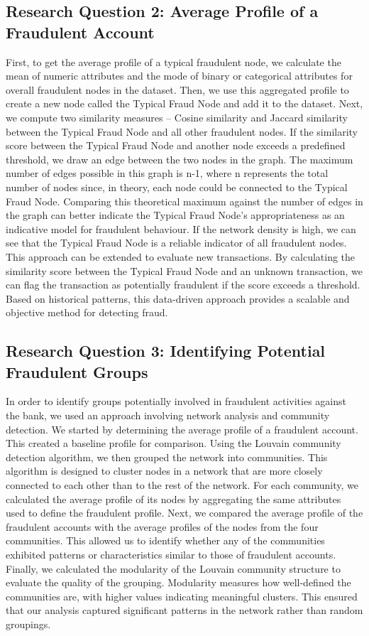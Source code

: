 \documentclass{styles/svproc}
\begin{document}
\subsection*{Research Question 2: Average Profile of a Fraudulent Account}
First, to get the average profile of a typical fraudulent node, we calculate the mean of numeric attributes and the mode of binary or categorical attributes for overall fraudulent nodes in the dataset. Then, we use this aggregated profile to create a new node called the Typical Fraud Node and add it to the dataset.
Next, we compute two similarity measures -- Cosine similarity and Jaccard similarity between the Typical Fraud Node and all other fraudulent nodes. If the similarity score between the Typical Fraud Node and another node exceeds a predefined threshold, we draw an edge between the two nodes in the graph.
The maximum number of edges possible in this graph is n-1, where n represents the total number of nodes since, in theory, each node could be connected to the Typical Fraud Node.  Comparing this theoretical maximum against the number of edges in the graph can better indicate the Typical Fraud Node's appropriateness as an indicative model for fraudulent behaviour.
If the network density is high, we can see that the Typical Fraud Node is a reliable indicator of all fraudulent nodes. This approach can be extended to evaluate new transactions. By calculating the similarity score between the Typical Fraud Node and an unknown transaction, we can flag the transaction as potentially fraudulent if the score exceeds a threshold.  Based on historical patterns, this data-driven approach provides a scalable and objective method for detecting fraud.



\subsection*{Research Question 3: Identifying Potential Fraudulent Groups}
In order to identify groups potentially involved in fraudulent activities against the bank, we used an approach involving network analysis and community detection. We started by determining the average profile of a fraudulent account. This created a baseline profile for comparison. Using the Louvain community detection algorithm, we then grouped the network into communities. This algorithm is designed to cluster nodes in a network that are more closely connected to each other than to the rest of the network. For each community, we calculated the average profile of its nodes by aggregating the same attributes used to define the fraudulent profile. 
Next, we compared the average profile of the fraudulent accounts with the average profiles of the nodes from the four communities. This allowed us to identify whether any of the communities exhibited patterns or characteristics similar to those of fraudulent accounts.
Finally, we calculated the modularity of the Louvain community structure to evaluate the quality of the grouping. Modularity measures how well-defined the communities are, with higher values indicating meaningful clusters. This ensured that our analysis captured significant patterns in the network rather than random groupings.
\end{document}
